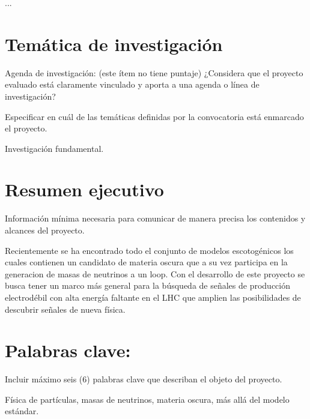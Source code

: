 ...

\section{Temática de investigación}
\begin{evaluacioncodi}
  Agenda de investigación: (este ítem no tiene puntaje)
¿Considera que el proyecto evaluado está claramente vinculado y aporta a una agenda o línea de
investigación?
\end{evaluacioncodi}
\begin{colciencias}
 Especificar en cuál de las temáticas definidas por la convocatoria está enmarcado el proyecto.
\end{colciencias}
Investigación fundamental. 
\section{Resumen ejecutivo}
\begin{colciencias}
Información mínima necesaria para comunicar de manera precisa los contenidos y alcances del proyecto.
\end{colciencias}
Recientemente se ha encontrado todo el conjunto de modelos
escotogénicos los cuales contienen un candidato de materia oscura que
a su vez participa en la generacion de masas de neutrinos a un
loop. Con el desarrollo de este proyecto se busca tener un marco más
general para la búsqueda de señales de producción electrodébil con
alta energía faltante en el LHC que amplien las posibilidades de
descubrir señales de nueva física.
\section{Palabras clave:}
\begin{colciencias}
Incluir máximo seis (6) palabras clave que describan el objeto del proyecto. 
\end{colciencias} 
Física de partículas, masas de neutrinos, materia oscura, más allá del modelo estándar.